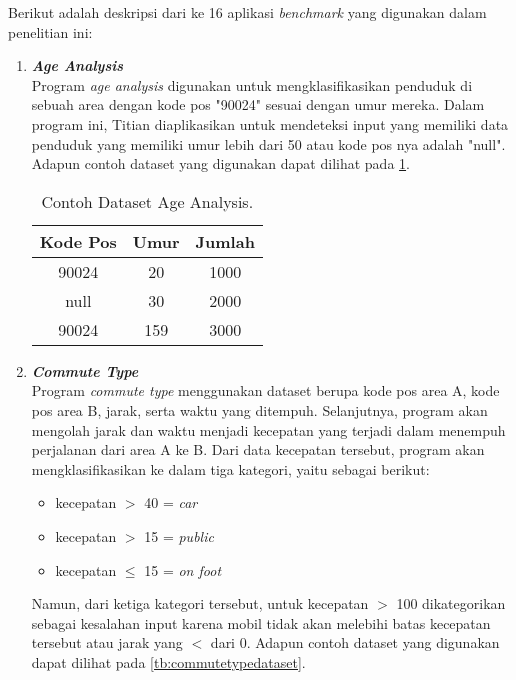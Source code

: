 Berikut adalah deskripsi dari ke 16 aplikasi \emph{benchmark}
yang digunakan dalam penelitian ini:
\begin{enumerate}
      \item \emph{\textbf{Age Analysis}} \\
            Program \emph{age analysis} digunakan untuk mengklasifikasikan penduduk di sebuah area dengan kode pos "90024" sesuai dengan umur mereka. 
            Dalam program ini, Titian diaplikasikan untuk mendeteksi input yang memiliki data penduduk yang memiliki umur lebih dari 50 atau kode pos nya adalah "null".
            Adapun contoh dataset yang digunakan dapat 
            dilihat pada \ref{tb:ageanalysisdataset}.

            \begin{longtable}{|c|c|c|}
                  \caption{Contoh Dataset Age Analysis.}
                  \label{tb:ageanalysisdataset} \\
                  \hline
                  \rowcolor[HTML]{C0C0C0}
                  \textbf{Kode Pos} & \textbf{Umur} & \textbf{Jumlah} \\
                  \hline
                  90024 & 20 & 1000 \\
                  null & 30 & 2000 \\
                  90024 & 159 & 3000 \\
                  \hline
            \end{longtable}
      
      \item \emph{\textbf{Commute Type}} \\
            Program \emph{commute type} menggunakan dataset berupa kode pos area A, kode pos area B, jarak, serta waktu yang ditempuh. Selanjutnya, program akan mengolah jarak dan waktu menjadi kecepatan yang terjadi dalam menempuh perjalanan dari area A ke B. Dari data kecepatan tersebut, program akan mengklasifikasikan ke dalam tiga kategori, yaitu sebagai berikut:
            \begin{itemize}
                  \item kecepatan $ > $ 40 = \emph{car}
                  \item kecepatan $ > $ 15 = \emph{public}
                  \item kecepatan $ \leq $ 15 = \emph{on foot}
            \end{itemize}
            Namun, dari ketiga kategori tersebut, untuk kecepatan $ > $ 100 dikategorikan sebagai kesalahan input karena mobil tidak akan melebihi batas kecepatan tersebut atau jarak yang $ < $ dari 0.
            Adapun contoh dataset yang digunakan dapat 
            dilihat pada \ref{tb:commutetypedataset}.


\end{enumerate}
